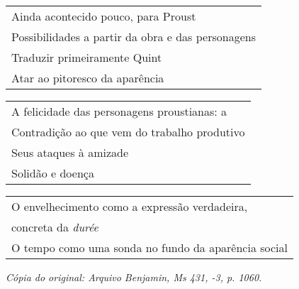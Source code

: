 \begin{table}[httn!]
\begin{tabular}{|l|}
\hline
Ainda acontecido pouco, para Proust                                          \\
Possibilidades a partir da obra e das personagens                                              \\
Traduzir primeiramente Quint \\ 
Atar ao pitoresco da aparência \\ \hline
\end{tabular}
\end{table}

\pagebreak

\begin{table}[httn!]
\begin{tabular}{|l|}
\hline
A felicidade das personagens proustianas: a              \\
Contradição ao que vem do trabalho produtivo             \\
Seus ataques à amizade                                   \\ 
Solidão e doença                                          \\ \hline
\end{tabular}
\end{table}

\begin{table}[httn!]
\begin{tabular}{|l|}
\hline
O envelhecimento como a expressão verdadeira,              \\
concreta da \emph{durée}             \\
O tempo como uma sonda no fundo da aparência social                       \\ \hline
\end{tabular}
\end{table}



\begin{flushright}
\emph{\small{Cópia do original: Arquivo Benjamin, Ms 431, -3, p. 1060.}}
\end{flushright}

